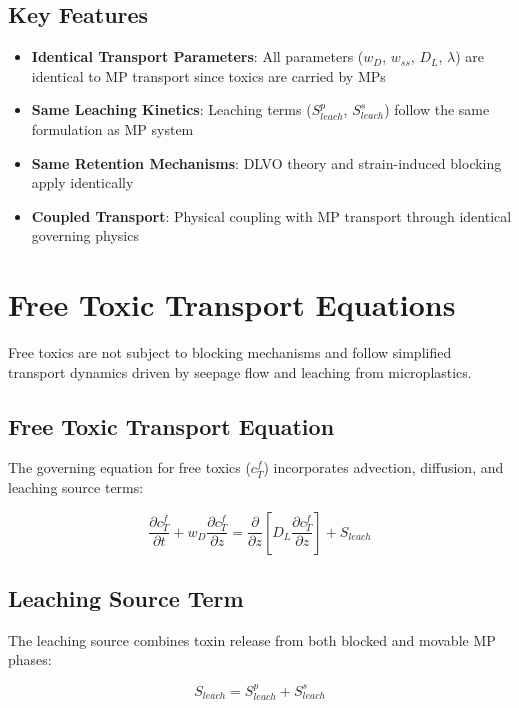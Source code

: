 \documentclass[11pt,a4paper]{article}
\begin{document}
\subsection{Key Features}

\begin{itemize}
    \item \textbf{Identical Transport Parameters}: All parameters ($w_D$, $w_{ss}$, $D_L$, $\lambda$) are identical to MP transport since toxics are carried by MPs
    \item \textbf{Same Leaching Kinetics}: Leaching terms ($S_{leach}^p$, $S_{leach}^s$) follow the same formulation as MP system
    \item \textbf{Same Retention Mechanisms}: DLVO theory and strain-induced blocking apply identically
    \item \textbf{Coupled Transport}: Physical coupling with MP transport through identical governing physics
\end{itemize}

\section{Free Toxic Transport Equations}

Free toxics are not subject to blocking mechanisms and follow simplified transport dynamics driven by seepage flow and leaching from microplastics.

\subsection{Free Toxic Transport Equation}

The governing equation for free toxics ($c_T^f$) incorporates advection, diffusion, and leaching source terms:

\begin{equation}
\boxed{
\frac{\partial c_T^f}{\partial t} + w_D \frac{\partial c_T^f}{\partial z} = \frac{\partial}{\partial z}\left[D_L \frac{\partial c_T^f}{\partial z}\right] + S_{leach}
}
\end{equation}

\subsection{Leaching Source Term}

The leaching source combines toxin release from both blocked and movable MP phases:

\begin{equation}
\boxed{
S_{leach} = S_{leach}^p + S_{leach}^s
}
\end{equation}
\end{document}
